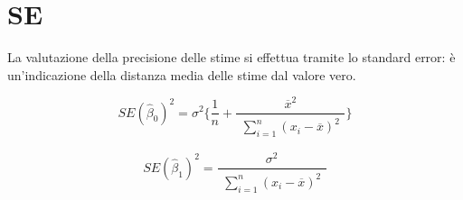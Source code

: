 \section{SE}

La valutazione della precisione delle stime si effettua tramite lo standard error: è un'indicazione della distanza media delle stime dal valore vero.

\begin{equation}
SE({\hat{\beta}}_0)^2 = {\sigma}^2\{\frac{1}{n} + \frac{\overline{x}^2}{\begin{matrix} \sum_{i=1}^n (x_i - \overline{x})^2 \end{matrix}}\}
\end{equation}

\begin{equation}
SE({\hat{\beta}}_1)^2 = \frac{{\sigma}^2}{\begin{matrix} \sum_{i=1}^n (x_i - \overline{x})^2 \end{matrix}}
\end{equation}
